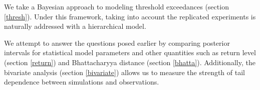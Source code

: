 
We take a Bayesian approach to modeling threshold exceedances (section \ref{thresh}). Under this framework, taking into account the replicated experiments is naturally addressed with a hierarchical model.

We attempt to answer the questions posed earlier by comparing posterior intervals for statistical model parameters and other quantities such as return level (section \ref{return}) and Bhattacharyya distance (section \ref{bhatta}). Additionally, the bivariate analysis (section \ref{bivariate}) allows us to measure the strength of tail dependence between simulations and observations.


